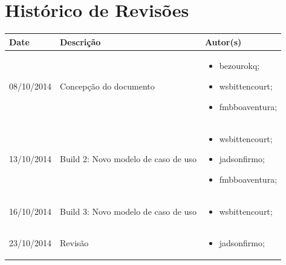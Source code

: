 \documentclass{article}
\begin{document}

\capa
\newpage

\section*{\center Histórico de Revisões}
  \vspace*{1cm}
  \begin{table}[ht]
    \centering
    \begin{tabular}[pos]{|m{2cm} | m{7.2cm} | m{3.8cm}|} 
      \hline
      \cellcolor[gray]{0.9}
      \textbf{Date} & \cellcolor[gray]{0.9}\textbf{Descrição} & \cellcolor[gray]{0.9}\textbf{Autor(s)}\\ \hline
      \hline
      \small 08/10/2014 & \small Concepção do documento & \small 
      \begin{itemize}
      	\item bezourokq;
      	\item wsbittencourt;
      	\item fmbboaventura;  
	  \end{itemize}      	
      \\ \hline
      \small 13/10/2014 & \small Build 2: Novo modelo de caso de uso & \small 
      \begin{itemize}
      	\item wsbittencourt;
      	\item jadsonfirmo;
      	\item fmbboaventura;  
	  \end{itemize}      	
      \\ \hline
      \small 16/10/2014 & \small Build 3: Novo modelo de caso de uso & \small 
      \begin{itemize}
      	\item wsbittencourt; 
	  \end{itemize}  
	  \\ \hline
	  \small 23/10/2014 & \small Revisão & \small 
      \begin{itemize}
      	\item jadsonfirmo; 
	  \end{itemize}  
	  \\ \hline
    \end{tabular}
  \end{table}
\end{document}
